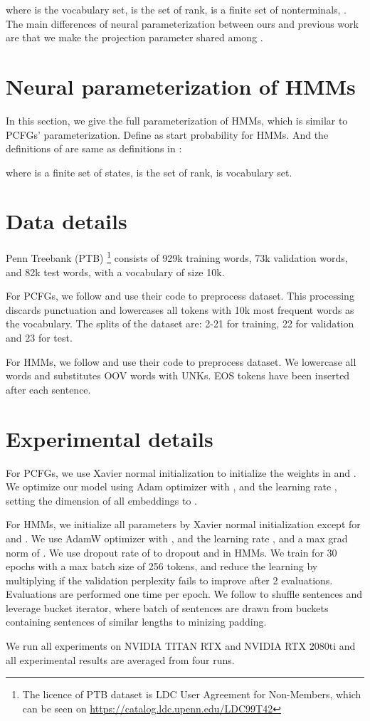 \documentclass[11pt]{article}
\begin{document}
where  is the vocabulary set,  is the set of rank,  is a finite set of nonterminals, . The main differences of neural parameterization between ours and previous work are that we make the projection parameter  shared among . 


\section{Neural parameterization of HMMs}
\label{appd:hmm}
In this section, we give the full parameterization of HMMs, which is similar to PCFGs' parameterization. Define  as start probability for HMMs. And the definitions of  are same as definitions in :


where  is a finite set of states,  is the set of rank,  is vocabulary set.

\section{Data details}
\label{appd:data}
Penn Treebank (PTB) \citep{marcus-etal-1994-penn}\footnote{The licence of PTB dataset is LDC User Agreement for Non-Members, which can be seen on \url{https://catalog.ldc.upenn.edu/LDC99T42}} consists of 929k training words, 73k validation words, and 82k test words, with a vocabulary of size 10k. 

For PCFGs, we follow \citet{yang-etal-2021-pcfgs} and use their code to preprocess dataset. This processing discards punctuation and lowercases all tokens with 10k most frequent words as the vocabulary. The splits of the dataset are: 2-21 for training, 22 for validation and 23 for test.

For HMMs, we follow \citet{chiu2021low} and use their code to preprocess dataset. We lowercase all words and substitutes OOV words with UNKs. EOS tokens have been inserted after each sentence.

\section{Experimental details}
\label{appd:exp}
For PCFGs, we use Xavier normal initialization to initialize the weights in  and . We optimize our model using Adam optimizer with , and the learning rate , setting the dimension of all embeddings to . 

For HMMs, we initialize all parameters by Xavier normal initialization except for  and . We use AdamW optimizer with , and the learning rate , and a max grad norm of . We use dropout rate of  to dropout  and  in HMMs. We train for 30 epochs with a max batch size of 256 tokens, and reduce the learning by multiplying  if the validation perplexity fails to improve after 2 evaluations. Evaluations are performed one time per epoch. We follow \citet{chiu2021low} to shuffle sentences and leverage bucket iterator, where batch of sentences are drawn from buckets containing sentences of similar lengths to minizing padding.

We run all experiments on NVIDIA TITAN RTX and NVIDIA RTX 2080ti and all experimental results are averaged from four runs. 
\end{document}
